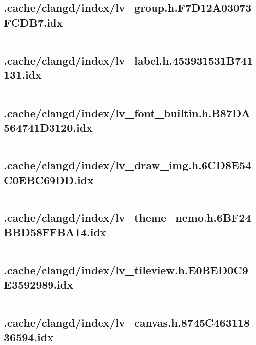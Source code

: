 \subsection{.cache/clangd/index/lv_group.h.F7D12A03073FCDB7.idx}
\inputminted[linenos,tabsize=2,breaklines, breakanywhere]{c}{lv_group.h.F7D12A03073FCDB7.idx}
\pagebreak

\subsection{.cache/clangd/index/lv_label.h.453931531B741131.idx}
\inputminted[linenos,tabsize=2,breaklines, breakanywhere]{c}{lv_label.h.453931531B741131.idx}
\pagebreak

\subsection{.cache/clangd/index/lv_font_builtin.h.B87DA564741D3120.idx}
\inputminted[linenos,tabsize=2,breaklines, breakanywhere]{c}{lv_font_builtin.h.B87DA564741D3120.idx}
\pagebreak

\subsection{.cache/clangd/index/lv_draw_img.h.6CD8E54C0EBC69DD.idx}
\inputminted[linenos,tabsize=2,breaklines, breakanywhere]{c}{lv_draw_img.h.6CD8E54C0EBC69DD.idx}
\pagebreak

\subsection{.cache/clangd/index/lv_theme_nemo.h.6BF24BBD58FFBA14.idx}
\inputminted[linenos,tabsize=2,breaklines, breakanywhere]{c}{lv_theme_nemo.h.6BF24BBD58FFBA14.idx}
\pagebreak

\subsection{.cache/clangd/index/lv_tileview.h.E0BED0C9E3592989.idx}
\inputminted[linenos,tabsize=2,breaklines, breakanywhere]{c}{lv_tileview.h.E0BED0C9E3592989.idx}
\pagebreak

\subsection{.cache/clangd/index/lv_canvas.h.8745C46311836594.idx}
\inputminted[linenos,tabsize=2,breaklines, breakanywhere]{c}{lv_canvas.h.8745C46311836594.idx}
\pagebreak

